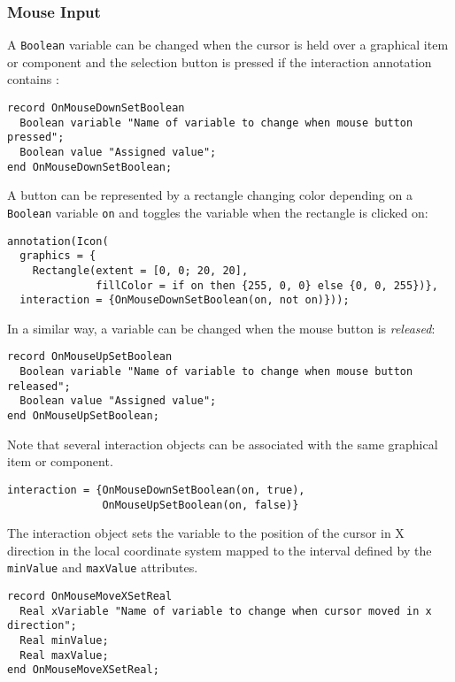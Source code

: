 \subsubsection{Mouse Input}\label{mouse-input}

A \lstinline!Boolean! variable can be changed when the cursor is held over a graphical item or component and the selection button is pressed if the interaction annotation contains :
\begin{lstlisting}[language=modelica]
record OnMouseDownSetBoolean
  Boolean variable "Name of variable to change when mouse button pressed";
  Boolean value "Assigned value";
end OnMouseDownSetBoolean;
\end{lstlisting}

\begin{example}
A button can be represented by a rectangle changing color depending on a \lstinline!Boolean! variable \lstinline!on! and toggles the
variable when the rectangle is clicked on:
\begin{lstlisting}[language=modelica]
annotation(Icon(
  graphics = {
    Rectangle(extent = [0, 0; 20, 20],
              fillColor = if on then {255, 0, 0} else {0, 0, 255})},
  interaction = {OnMouseDownSetBoolean(on, not on)}));
\end{lstlisting}
\end{example}

In a similar way, a variable can be changed when the mouse button is \emph{released}:
\begin{lstlisting}[language=modelica]
record OnMouseUpSetBoolean
  Boolean variable "Name of variable to change when mouse button released";
  Boolean value "Assigned value";
end OnMouseUpSetBoolean;
\end{lstlisting}%

Note that several interaction objects can be associated with the same graphical item or component.
\begin{example}
\begin{lstlisting}[language=modelica]
interaction = {OnMouseDownSetBoolean(on, true),
               OnMouseUpSetBoolean(on, false)}
\end{lstlisting}
\end{example}

The  interaction object sets the variable to the position of the cursor in X direction in the local coordinate system mapped to the interval defined by the \lstinline!minValue! and \lstinline!maxValue! attributes.
\begin{lstlisting}[language=modelica]
record OnMouseMoveXSetReal
  Real xVariable "Name of variable to change when cursor moved in x direction";
  Real minValue;
  Real maxValue;
end OnMouseMoveXSetReal;
\end{lstlisting}

